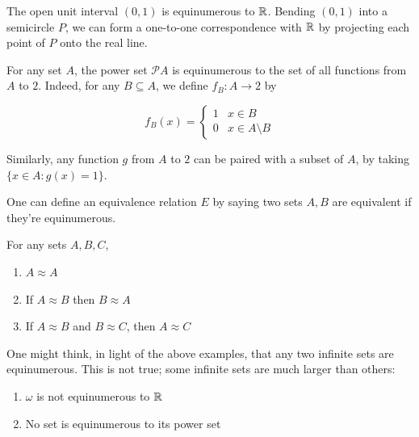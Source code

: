 \begin{example}
    The open unit interval $(0,1)$ is equinumerous to $\mathbb{R}$. Bending $(0,1)$ into a semicircle $P$, we can form a one-to-one correspondence with $\mathbb{R}$ by projecting each point of $P$ onto the real line. 
\end{example}

\begin{example}
    For any set $A$, the power set $\mathcal{P}A$ is equinumerous to the set of all functions from $A$ to $2$. Indeed, for any $B \subseteq A$, we define $f_B: A \to 2$ by 

    \[f_B(x) = \begin{cases}
        1 & x \in B \\ 0 & x \in A\setminus B
    \end{cases}\]

    Similarly, any function $g$ from $A$ to $2$ can be paired with a subset of $A$, by taking $\{x \in A : g(x) = 1\}$.
\end{example}

One can define an equivalence relation $E$ by saying two sets $A,B$ are equivalent if they're equinumerous.

\begin{theorem}
    For any sets $A,B,C$,
    \begin{enumerate}[label=(\roman*)]
        \item $A \approx A$
        \item If $A \approx B$ then $B \approx A$
        \item If $A \approx B$ and $B \approx C$, then $A \approx C$
    \end{enumerate}
\end{theorem}

One might think, in light of the above examples, that any two infinite sets are equinumerous. This is not true; some infinite sets are much larger than others:

\begin{theorem}
    \begin{enumerate}[label=(\roman*)]
        \item $\omega$ is not equinumerous to $\mathbb{R}$
        \item No set is equinumerous to its power set
    \end{enumerate}
\end{theorem}

